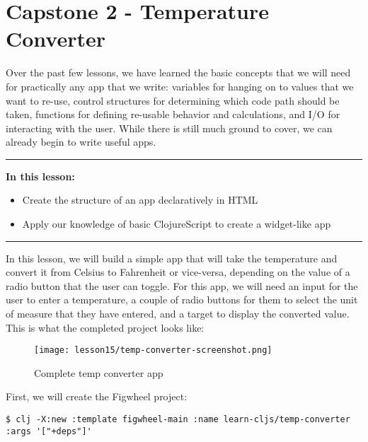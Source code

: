 \documentclass[10pt,twoside,openright]{memoir}
\begin{document}
\chapter{Capstone 2 - Temperature Converter}

Over the past few lessons, we have learned the basic concepts that we
will need for practically any app that we write: variables for hanging
on to values that we want to re-use, control structures for determining
which code path should be taken, functions for defining re-usable
behavior and calculations, and I/O for interacting with the user. While
there is still much ground to cover, we can already begin to write
useful apps.

\begin{center}\rule{0.5\linewidth}{0.5pt}\end{center}

\textbf{In this lesson:}

\begin{itemize}
\tightlist
\item
  Create the structure of an app declaratively in HTML
\item
  Apply our knowledge of basic ClojureScript to create a widget-like app
\end{itemize}

\begin{center}\rule{0.5\linewidth}{0.5pt}\end{center}

In this lesson, we will build a simple app that will take the
temperature and convert it from Celsius to Fahrenheit or vice-versa,
depending on the value of a radio button that the user can toggle. For
this app, we will need an input for the user to enter a temperature, a
couple of radio buttons for them to select the unit of measure that they
have entered, and a target to display the converted value. This is what
the completed project looks like:

\begin{figure}[H]
\caption{Complete temp converter app}
\centering
\texttt{[image: lesson15/temp-converter-screenshot.png]}
\end{figure}

First, we will create the Figwheel project:

\begin{verbatim}
$ clj -X:new :template figwheel-main :name learn-cljs/temp-converter :args '["+deps"]'
\end{verbatim}
\end{document}
